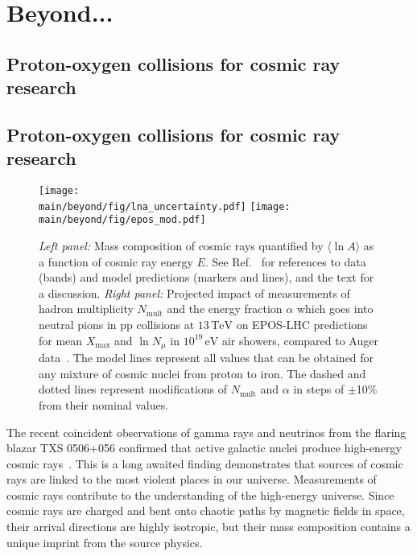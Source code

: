\documentclass[../report.tex]{subfiles}
\providecommand{\main}{..}
\newcommand{\mlna}{\langle \ln\!A \rangle}
\newcommand{\nmu}{N_\mu}
\newcommand{\lnnmu}{\ln\!\nmu}
\newcommand{\xmax}{X_\text{max}}
\newcommand{\nmult}{N_\text{mult}}
\newcommand{\si}[1]{\ensuremath{\text{#1}}}
\newcommand{\SI}[2]{\ensuremath{#1\,\si{#2}}}
\begin{document}
\section{Beyond...}

\subsection{Proton-oxygen collisions for cosmic ray research}
\label{sec:pOcosmic}

\subsection{Proton-oxygen collisions for cosmic ray research}
\label{sec:pOcosmic}

\begin{figure}
\texttt{[image: \\main/beyond/fig/lna\_uncertainty.pdf]}
\texttt{[image: \\main/beyond/fig/epos\_mod.pdf]}
\caption{\emph{Left panel:} Mass composition of cosmic rays quantified by $\mlna$ as a function of cosmic ray energy $E$. See Ref.~\cite{kampert_cr_review} for references to data (bands) and model predictions (markers and lines), and the text for a discussion. \emph{Right panel:} Projected impact of measurements of hadron multiplicity $\nmult$ and the energy fraction $\alpha$ which goes into neutral pions in pp collisions at \SI{13}{TeV} on EPOS-LHC predictions for mean $\xmax$ and $\lnnmu$ in $10^{19}$\,\si{eV} air showers, compared to Auger data~\cite{Aab:2014pza}. The model lines represent all values that can be obtained for any mixture of cosmic nuclei from proton to iron. The dashed and dotted lines represent modifications of $\nmult$ and $\alpha$ in steps of $\pm$10\% from their nominal values.}
\label{fig:cosmic_rays}
\end{figure}

The recent coincident observations of gamma rays and neutrinos from the flaring blazar TXS 0506+056 confirmed that active galactic nuclei produce high-energy cosmic rays~\cite{IceCube:2018dnn}. This is a long awaited finding demonstrates that sources of cosmic rays are linked to the most violent places in our universe. Measurements of cosmic rays contribute to the understanding of the high-energy universe. Since cosmic rays are charged and bent onto chaotic paths by magnetic fields in space, their arrival directions are highly isotropic, but their mass composition contains a unique imprint from the source physics.
\end{document}
